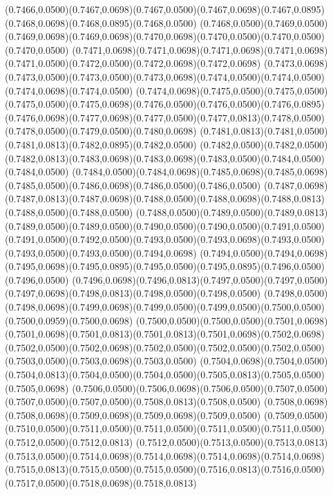(0.7466,0.0500)(0.7467,0.0698)(0.7467,0.0500)(0.7467,0.0698)(0.7467,0.0895)(0.7468,0.0698)(0.7468,0.0895)(0.7468,0.0500)
(0.7468,0.0500)(0.7469,0.0500)(0.7469,0.0698)(0.7469,0.0698)(0.7470,0.0698)(0.7470,0.0500)(0.7470,0.0500)(0.7470,0.0500)
(0.7471,0.0698)(0.7471,0.0698)(0.7471,0.0698)(0.7471,0.0698)(0.7471,0.0500)(0.7472,0.0500)(0.7472,0.0698)(0.7472,0.0698)
(0.7473,0.0698)(0.7473,0.0500)(0.7473,0.0500)(0.7473,0.0698)(0.7474,0.0500)(0.7474,0.0500)(0.7474,0.0698)(0.7474,0.0500)
(0.7474,0.0698)(0.7475,0.0500)(0.7475,0.0500)(0.7475,0.0500)(0.7475,0.0698)(0.7476,0.0500)(0.7476,0.0500)(0.7476,0.0895)
(0.7476,0.0698)(0.7477,0.0698)(0.7477,0.0500)(0.7477,0.0813)(0.7478,0.0500)(0.7478,0.0500)(0.7479,0.0500)(0.7480,0.0698)
(0.7481,0.0813)(0.7481,0.0500)(0.7481,0.0813)(0.7482,0.0895)(0.7482,0.0500)
\PST@Solid(0.7482,0.0500)(0.7482,0.0500)(0.7482,0.0813)(0.7483,0.0698)(0.7483,0.0698)(0.7483,0.0500)(0.7484,0.0500)(0.7484,0.0500)
(0.7484,0.0500)(0.7484,0.0698)(0.7485,0.0698)(0.7485,0.0698)(0.7485,0.0500)(0.7486,0.0698)(0.7486,0.0500)(0.7486,0.0500)
(0.7487,0.0698)(0.7487,0.0813)(0.7487,0.0698)(0.7488,0.0500)(0.7488,0.0698)(0.7488,0.0813)(0.7488,0.0500)(0.7488,0.0500)
(0.7488,0.0500)(0.7489,0.0500)(0.7489,0.0813)(0.7489,0.0500)(0.7489,0.0500)(0.7490,0.0500)(0.7490,0.0500)(0.7491,0.0500)
(0.7491,0.0500)(0.7492,0.0500)(0.7493,0.0500)(0.7493,0.0698)(0.7493,0.0500)(0.7493,0.0500)(0.7493,0.0500)(0.7494,0.0698)
(0.7494,0.0500)(0.7494,0.0698)(0.7495,0.0698)(0.7495,0.0895)(0.7495,0.0500)(0.7495,0.0895)(0.7496,0.0500)(0.7496,0.0500)
(0.7496,0.0698)(0.7496,0.0813)(0.7497,0.0500)(0.7497,0.0500)(0.7497,0.0698)(0.7498,0.0813)(0.7498,0.0500)(0.7498,0.0500)
(0.7498,0.0500)(0.7498,0.0698)(0.7499,0.0698)(0.7499,0.0500)(0.7499,0.0500)(0.7500,0.0500)(0.7500,0.0959)(0.7500,0.0698)
(0.7500,0.0500)(0.7500,0.0500)(0.7501,0.0698)(0.7501,0.0698)(0.7501,0.0813)(0.7501,0.0813)(0.7501,0.0698)(0.7502,0.0698)
(0.7502,0.0500)(0.7502,0.0698)(0.7502,0.0500)(0.7502,0.0500)(0.7502,0.0500)(0.7503,0.0500)(0.7503,0.0698)(0.7503,0.0500)
(0.7504,0.0698)(0.7504,0.0500)(0.7504,0.0813)(0.7504,0.0500)(0.7504,0.0500)(0.7505,0.0813)(0.7505,0.0500)(0.7505,0.0698)
(0.7506,0.0500)(0.7506,0.0698)(0.7506,0.0500)(0.7507,0.0500)(0.7507,0.0500)(0.7507,0.0500)(0.7508,0.0813)(0.7508,0.0500)
(0.7508,0.0698)(0.7508,0.0698)(0.7509,0.0698)(0.7509,0.0698)(0.7509,0.0500)
\PST@Solid(0.7509,0.0500)(0.7510,0.0500)(0.7511,0.0500)(0.7511,0.0500)(0.7511,0.0500)(0.7511,0.0500)(0.7512,0.0500)(0.7512,0.0813)
(0.7512,0.0500)(0.7513,0.0500)(0.7513,0.0813)(0.7513,0.0500)(0.7514,0.0698)(0.7514,0.0698)(0.7514,0.0698)(0.7514,0.0698)
(0.7515,0.0813)(0.7515,0.0500)(0.7515,0.0500)(0.7516,0.0813)(0.7516,0.0500)(0.7517,0.0500)(0.7518,0.0698)(0.7518,0.0813)
